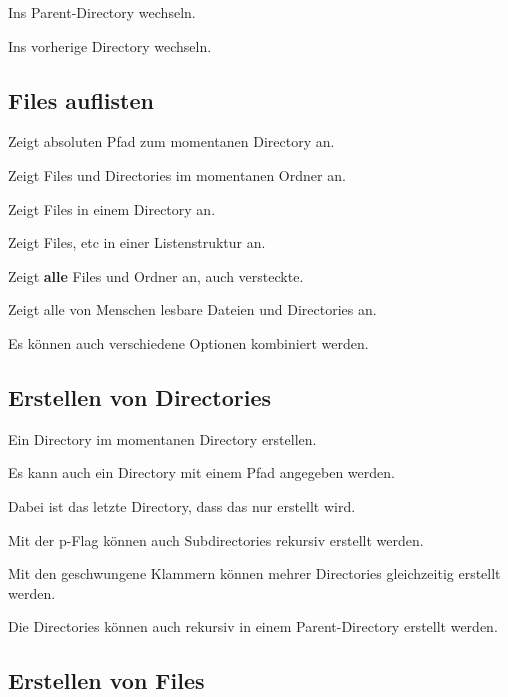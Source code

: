 \documentclass{article}
\begin{document}
Ins Parent-Directory wechseln.

Ins vorherige Directory wechseln.

\subsection{Files auflisten}
Zeigt absoluten Pfad zum momentanen Directory an.

Zeigt Files und Directories im momentanen Ordner an.

Zeigt Files in einem Directory an.

Zeigt Files, etc in einer Listenstruktur an.

Zeigt \textbf{alle} Files und Ordner an, auch versteckte.

Zeigt alle von Menschen lesbare Dateien und Directories an.

Es können auch verschiedene Optionen kombiniert werden.

\subsection{Erstellen von Directories}

Ein Directory im momentanen Directory erstellen.

Es kann auch ein Directory mit einem Pfad angegeben werden.

Dabei ist das letzte Directory, dass das nur erstellt wird.

Mit der p-Flag können auch Subdirectories rekursiv erstellt werden.

Mit den geschwungene Klammern können mehrer Directories gleichzeitig erstellt werden.

Die Directories können auch rekursiv in einem Parent-Directory erstellt werden.

\subsection{Erstellen von Files}
\end{document}
